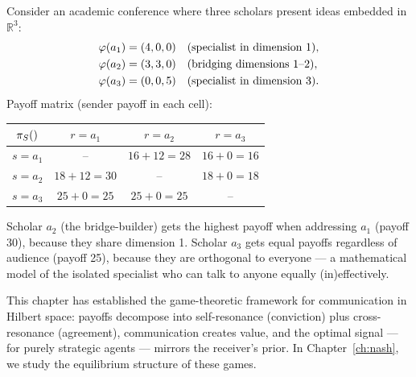 \begin{example}
\label{ex:academic}
Consider an academic conference where three scholars present ideas embedded in
$\mathbb{R}^3$:
\begin{align*}
  \varphi(a_1) &= (4, 0, 0) \quad \text{(specialist in dimension 1)}, \\
  \varphi(a_2) &= (3, 3, 0) \quad \text{(bridging dimensions 1--2)}, \\
  \varphi(a_3) &= (0, 0, 5) \quad \text{(specialist in dimension 3)}.
\end{align*}
Payoff matrix (sender payoff in each cell):
\begin{center}
\begin{tabular}{c|ccc}
$\pi_{S}()$ & $r = a_1$ & $r = a_2$ & $r = a_3$ \\
\hline
$s = a_1$ & -- & $16 + 12 = 28$ & $16 + 0 = 16$ \\
$s = a_2$ & $18 + 12 = 30$ & -- & $18 + 0 = 18$ \\
$s = a_3$ & $25 + 0 = 25$ & $25 + 0 = 25$ & -- \\
\end{tabular}
\end{center}
Scholar $a_2$ (the bridge-builder) gets the highest payoff when addressing
$a_1$ (payoff 30), because they share dimension 1. Scholar $a_3$ gets equal
payoffs regardless of audience (payoff 25), because they are orthogonal to
everyone --- a mathematical model of the isolated specialist who can talk
to anyone equally (in)effectively.
\end{example}

\bigskip

This chapter has established the game-theoretic framework for communication in
Hilbert space: payoffs decompose into self-resonance (conviction) plus
cross-resonance (agreement), communication creates value, and the optimal
signal --- for purely strategic agents --- mirrors the receiver's prior. In
Chapter~\ref{ch:nash}, we study the equilibrium structure of these games.
